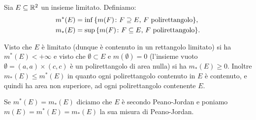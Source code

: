 \begin{definition}
\label{def:peano-jordan}%
%
%
%
%
Sia $E\subseteq \mathbb R^2$ un insieme limitato. Definiamo:
\begin{align*}
m^*(E) &= \inf{\left\{ m(F)\colon \text{$F\supseteq E$, $F$ polirettangolo} \right\}}, \\
m_*(E) &= \sup{\left\{ m(F)\colon \text{$F\subseteq E$, $F$ polirettangolo} \right\}}.
\end{align*}

Visto che $E$ è limitato (dunque è contenuto in un rettangolo limitato)
si ha $m^*(E)<+\infty$ e visto che $\emptyset \subset E$
e $m(\emptyset)=0$ (l'insieme vuoto $\emptyset = (a,a) \times (c,c)$ è un
polirettangolo di area nulla) si ha $m_*(E)\ge 0$. Inoltre $m_*(E)\le m^*(E)$
in quanto ogni polirettangolo contenuto in $E$ è contenuto, e quindi ha area non superiore, 
ad ogni polirettangolo contenente $E$.

Se $m^*(E) = m_*(E)$ diciamo che $E$ è  secondo Peano-Jordan
e poniamo $m(E) = m^*(E) = m_*(E)$ la sua misura di Peano-Jordan.
\end{definition}

